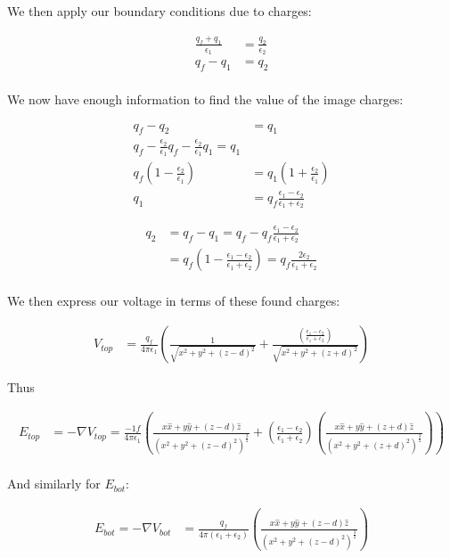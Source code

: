 \documentclass[10pt]{article} %
\begin{document}
We then apply our boundary conditions due to charges:

\begin{align*}
  \frac{q_f+q_1}{\epsilon_1} &= \frac{q_2}{\epsilon_2}\\
  q_f - q_1 &= q_2\\
\end{align*}

We now have enough information to find the value of the image charges:

\begin{align*}
  q_f - q_2 &= q_1\\
  q_f - \frac{\epsilon_2}{\epsilon_1}q_f - \frac{\epsilon_2}{\epsilon_1}q_1 = q_1\\
  q_f\left(1-\frac{\epsilon_2}{\epsilon_1}\right) &= q_1\left(1+\frac{\epsilon_2}{\epsilon_1}\right)\\
  q_1 &= q_f\frac{\epsilon_1-\epsilon_2}{\epsilon_1+\epsilon_2}
\end{align*}

\begin{align*}
  q_2 &= q_f-q_1 = q_f - q_f\frac{\epsilon_1-\epsilon_2}{\epsilon_1+\epsilon_2}\\
  &= q_f\left(1-\frac{\epsilon_1-\epsilon_2}{\epsilon_1+\epsilon_2}\right) = q_f\frac{2\epsilon_2}{\epsilon_1+\epsilon_2}\\
\end{align*}

We then express our voltage in terms of these found charges:

\begin{align*}
  V_{top} &= \frac{q_f}{4\pi\epsilon_1}\left(\frac{1}{\sqrt{x^2+y^2+(z-d)^2}} + \frac{\left(\frac{\epsilon_1-\epsilon_2}{\epsilon_1+\epsilon_2}\right)}{\sqrt{x^2+y^2+(z+d)^2}}\right)
\end{align*}

Thus

\begin{align*}
  E_{top} &= -\nabla V_{top} = \frac{-1f}{4\pi\epsilon_1}\left(\frac{x\hat{x}+y\hat{y}+(z-d)\hat{z}}{\left(x^2+y^2+(z-d)^2\right)^{\frac32}} + \left(\frac{\epsilon_1-\epsilon_2}{\epsilon_1+\epsilon_2}\right)\left(\frac{x\hat{x}+y\hat{y}+(z+d)\hat{z}}{\left(x^2+y^2+(z+d)^2\right)^{\frac32}}\right)\right)\\
\end{align*}

And similarly for $E_{bot}$:

\begin{align*}
  E_{bot} = -\nabla V_{bot} &= \frac{q_f}{4\pi\left(\epsilon_1+\epsilon_2\right)}\left(\frac{x\hat{x}+y\hat{y}+\left(z-d\right)\hat{z}}{\left(x^2+y^2+(z-d)^2\right)^{\frac32}}\right)
\end{align*}
\end{document}
